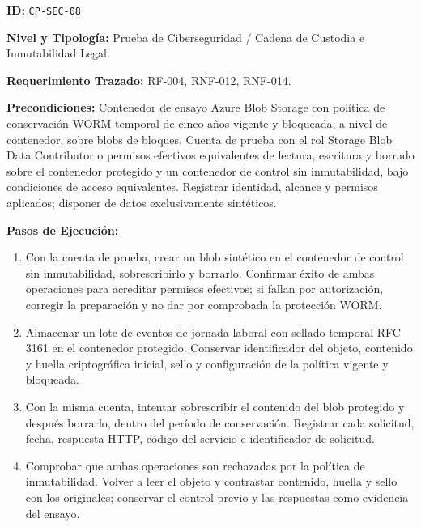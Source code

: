 \par\noindent\textbf{ID:} \texttt{C\allowbreak{}P\allowbreak{}-\allowbreak{}S\allowbreak{}E\allowbreak{}C\allowbreak{}-\allowbreak{}0\allowbreak{}8\allowbreak{}}\par
\par\noindent\textbf{Nivel y Tipología:} Prueba de Ciberseguridad / Cadena de Custodia e Inmutabilidad Legal.\par
\par\noindent\textbf{Requerimiento Trazado:} RF-004, RNF-012, RNF-014.\par
\par\noindent\textbf{Precondiciones:} Contenedor de ensayo Azure Blob Storage con política de conservación WORM temporal de cinco años vigente y bloqueada, a nivel de contenedor, sobre blobs de bloques. Cuenta de prueba con el rol Storage Blob Data Contributor o permisos efectivos equivalentes de lectura, escritura y borrado sobre el contenedor protegido y un contenedor de control sin inmutabilidad, bajo condiciones de acceso equivalentes. Registrar identidad, alcance y permisos aplicados; disponer de datos exclusivamente sintéticos.\par
\par\noindent\textbf{Pasos de Ejecución:} \par
\begin{enumerate}
\item Con la cuenta de prueba, crear un blob sintético en el contenedor de control sin inmutabilidad, sobrescribirlo y borrarlo. Confirmar éxito de ambas operaciones para acreditar permisos efectivos; si fallan por autorización, corregir la preparación y no dar por comprobada la protección WORM.
\item Almacenar un lote de eventos de jornada laboral con sellado temporal RFC 3161 en el contenedor protegido. Conservar identificador del objeto, contenido y huella criptográfica inicial, sello y configuración de la política vigente y bloqueada.
\item Con la misma cuenta, intentar sobrescribir el contenido del blob protegido y después borrarlo, dentro del período de conservación. Registrar cada solicitud, fecha, respuesta HTTP, código del servicio e identificador de solicitud.
\item Comprobar que ambas operaciones son rechazadas por la política de inmutabilidad. Volver a leer el objeto y contrastar contenido, huella y sello con los originales; conservar el control previo y las respuestas como evidencia del ensayo.
\end{enumerate}

